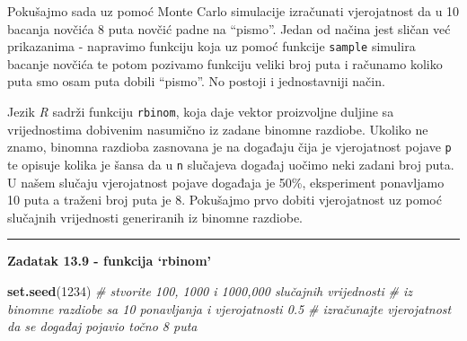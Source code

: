 \documentclass[]{book}
\newenvironment{Shaded}{\begin{snugshade}}{\end{snugshade}}
\newcommand{\KeywordTok}[1]{\textcolor[rgb]{0.13,0.29,0.53}{\textbf{#1}}}
\newcommand{\DecValTok}[1]{\textcolor[rgb]{0.00,0.00,0.81}{#1}}
\newcommand{\FloatTok}[1]{\textcolor[rgb]{0.00,0.00,0.81}{#1}}
\newcommand{\StringTok}[1]{\textcolor[rgb]{0.31,0.60,0.02}{#1}}
\newcommand{\CommentTok}[1]{\textcolor[rgb]{0.56,0.35,0.01}{\textit{#1}}}
\newcommand{\OperatorTok}[1]{\textcolor[rgb]{0.81,0.36,0.00}{\textbf{#1}}}
\newcommand{\NormalTok}[1]{#1}
\theoremstyle{definition}
\theoremstyle{definition}
\theoremstyle{definition}
\theoremstyle{remark}
\begin{document}
Pokušajmo sada uz pomoć Monte Carlo simulacije izračunati vjerojatnost
da u 10 bacanja novčića 8 puta novčić padne na ``pismo''. Jedan od
načina jest sličan već prikazanima - napravimo funkciju koja uz pomoć
funkcije \texttt{sample} simulira bacanje novčića te potom pozivamo
funkciju veliki broj puta i računamo koliko puta smo osam puta dobili
``pismo''. No postoji i jednostavniji način.

Jezik \emph{R} sadrži funkciju \texttt{rbinom}, koja daje vektor
proizvoljne duljine sa vrijednostima dobivenim nasumično iz zadane
binomne razdiobe. Ukoliko ne znamo, binomna razdioba zasnovana je na
događaju čija je vjerojatnost pojave \texttt{p} te opisuje kolika je
šansa da u \texttt{n} slučajeva događaj uočimo neki zadani broj puta. U
našem slučaju vjerojatnost pojave događaja je 50\%, eksperiment
ponavljamo 10 puta a traženi broj puta je 8. Pokušajmo prvo dobiti
vjerojatnost uz pomoć slučajnih vrijednosti generiranih iz binomne
razdiobe.

\begin{center}\rule{0.5\linewidth}{\linethickness}\end{center}

\textbf{Zadatak 13.9 - funkcija `rbinom'}

\begin{Shaded}
\begin{Highlighting}[]
\KeywordTok{set.seed}\NormalTok{(}\DecValTok{1234}\NormalTok{)}
\CommentTok{# stvorite 100, 1000 i 1000,000 slučajnih vrijednosti}
\CommentTok{# iz binomne razdiobe sa 10 ponavljanja i vjerojatnosti 0.5}
\CommentTok{# izračunajte vjerojatnost da se događaj pojavio točno 8 puta}
\end{Highlighting}
\end{Shaded}

\begin{Shaded}
\end{Shaded}
\end{document}
